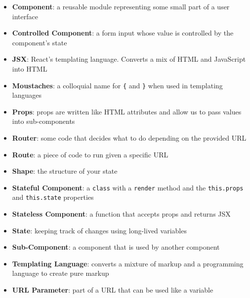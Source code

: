 \begin{itemize}[leftmargin=*]
    \item
        \textbf{Component}:
        a reusable module representing some small part of a user interface
    \item
        \textbf{Controlled Component}:
        a form input whose value is controlled by the component's state
    \item
        \textbf{JSX}:
        React's templating language. Converts a mix of HTML and JavaScript into HTML
    \item
        \textbf{Moustaches}:
        a colloquial name for \texttt{\{} and \texttt{\}} when used in templating languages
    \item
        \textbf{Props}:
        props are written like HTML attributes and allow us to pass values into sub-components
    \item
        \textbf{Router}:
        some code that decides what to do depending on the provided URL
    \item
        \textbf{Route}:
        a piece of code to run given a specific URL
    \item
        \textbf{Shape}:
        the structure of your state
    \item
        \textbf{Stateful Component}:
        a \texttt{class} with a \texttt{render} method and the \texttt{this.props} and \texttt{this.state} properties
    \item
        \textbf{Stateless Component}:
        a function that accepts props and returns JSX
    \item
        \textbf{State}:
        keeping track of changes using long-lived variables
    \item
        \textbf{Sub-Component}:
        a component that is used by another component
    \item
        \textbf{Templating Language}:
        converts a mixture of markup and a programming language to create pure markup
    \item
        \textbf{URL Parameter}:
        part of a URL that can be used like a variable
\end{itemize}
